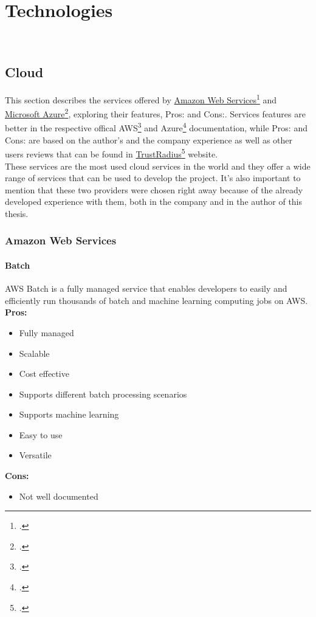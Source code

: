 \chapter{Technologies}
\label{cap:technologies}

\\

\section{Cloud}
This section describes the services offered by \href{https://aws.amazon.com/it/}{Amazon Web Services}\footcite{site:aws} and \href{https://azure.microsoft.com/it-it/}{Microsoft Azure}\footcite{site:azure}, exploring their features, Pros: and Cons:. 
Services features are better in the respective offical AWS\footcite{site:aws-docs} and Azure\footcite{site:azure-docs} documentation, 
while Pros: and Cons: are based on the author's and the company experience as well as other users reviews that can be found in 
\href{https://www.trustradius.com/}{TrustRadius}\footcite{site:trust-radius} website.\\
These services are the most used cloud services in the world and they offer a wide range of services that can be used to develop the project.
It's also important to mention that these two providers were chosen right away because of the already developed experience with them, both in the company and in the author of this thesis.
    \subsection{Amazon Web Services}

        \subsubsection{Batch}
        \label{aws:batch}
        AWS Batch is a fully managed service that enables developers to easily and efficiently run thousands of batch and machine learning computing jobs on AWS.\\
        \textbf{Pros:}
        \begin{itemize}
            \item Fully managed
            \item Scalable
            \item Cost effective
            \item Supports different batch processing scenarios
            \item Supports machine learning
            \item Easy to use
            \item Versatile
        \end{itemize}
        \textbf{Cons:}
        \begin{itemize}
            \item Not well documented
        \end{itemize}

